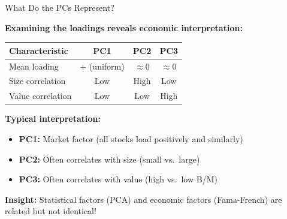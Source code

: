 \documentclass[10pt]{beamer}
\begin{document}
\begin{frame}{What Do the PCs Represent?}

  \textbf{Examining the loadings reveals economic interpretation:}

  \vspace{0.5em}
  \begin{center}
  \begin{tabular}{lccc}
    \toprule
    \textbf{Characteristic} & \textbf{PC1} & \textbf{PC2} & \textbf{PC3} \\
    \midrule
    Mean loading & $+$ (uniform) & $\approx 0$ & $\approx 0$ \\
    Size correlation & Low & High & Low \\
    Value correlation & Low & Low & High \\
    \bottomrule
  \end{tabular}
  \end{center}

  \vspace{0.5em}
  \textbf{Typical interpretation:}
  \begin{itemize}
    \item \textbf{PC1:} Market factor (all stocks load positively and similarly)
    \item \textbf{PC2:} Often correlates with size (small vs.\ large)
    \item \textbf{PC3:} Often correlates with value (high vs.\ low B/M)
  \end{itemize}

  \vspace{0.5em}
  \textbf{Insight:} Statistical factors (PCA) and economic factors (Fama-French) are related but not identical!
\end{frame}

\end{document}

